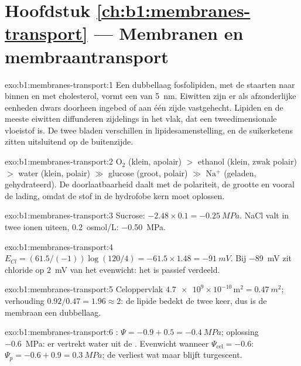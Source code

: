 \section*{Hoofdstuk \ref{ch:b1:membranes-transport} --- Membranen en membraantransport}

\begin{solution}{exo:b1:membranes-transport:1}
Een dubbellaag fosfolipiden, met de staarten naar binnen en met cholesterol,
vormt een  van \qty{5}{nm}. Eiwitten zijn er als afzonderlijke eenheden
dwars doorheen ingebed of aan één zijde vastgehecht. Lipiden en de meeste
eiwitten diffunderen zijdelings in het vlak, dat een tweedimensionale vloeistof
is. De twee bladen verschillen in lipidesamenstelling, en de suikerketens zitten
uitsluitend op de buitenzijde.
\end{solution}

\begin{solution}{exo:b1:membranes-transport:2}
$\mathrm{O_2}$ (klein, apolair) $>$ ethanol (klein, zwak polair)
$>$ water (klein, polair) $\gg$ glucose (groot, polair) $\gg$
$\mathrm{Na^+}$ (geladen, gehydrateerd). De doorlaatbaarheid daalt met de
polariteit, de grootte en vooral de lading, omdat de stof in de hydrofobe kern
moet oplossen.
\end{solution}

\begin{solution}{exo:b1:membranes-transport:3}
Sucrose: $-2.48\times 0.1 = \qty{-0.25}{MPa}$. NaCl valt in twee ionen uiteen,
\qty{0.2}{osmol/L}: \qty{-0.50}{MPa}.
\end{solution}

\begin{solution}{exo:b1:membranes-transport:4}
$E_{Cl} = (61.5/(-1))\log(120/4) = -61.5\times 1.48 = \qty{-91}{mV}$.
Bij \qty{-89}{mV} zit chloride op \qty{2}{mV} van het evenwicht: het is passief
verdeeld.
\end{solution}

\begin{solution}{exo:b1:membranes-transport:5}
Celoppervlak $\num{4.7e9}\times 10^{-10}\,\mathrm{m^2} =
\qty{0.47}{m^2}$; verhouding $0.92/0.47 = 1.96 \approx 2$: de lipide bedekt de
 twee keer, dus is de membraan een dubbellaag.
\end{solution}

\begin{solution}{exo:b1:membranes-transport:6}
: $\Psi = -0.9 + 0.5 = \qty{-0.4}{MPa}$; oplossing \qty{-0.6}{MPa}: er
vertrekt water uit de . Evenwicht wanneer $\Psi_{\text{cel}} = -0.6$:
$\Psi_p = -0.6 + 0.9 = \qty{0.3}{MPa}$; de  verliest wat  maar blijft
turgescent.
\end{solution}

